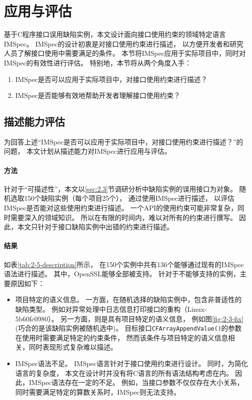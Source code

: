 \section{应用与评估}
\label{sec:2.5}
基于C程序接口误用缺陷实例，本文设计面向接口使用约束的领域特定语言IMSpec。
IMSpec的设计初衷是对接口使用约束进行描述，
以方便开发者和研究人员了解接口使用中需要满足的条件。
本节将IMSpec应用于实际项目中，同时对IMSpec的有效性进行评估。
特别地，本节将从两个角度入手：
\begin{enumerate}
	\item IMSpec是否可以应用于实际项目中，对接口使用约束进行描述？
	\item IMSpec是否能够有效地帮助开发者理解接口使用约束？
\end{enumerate}


\subsection{描述能力评估}
为回答上述“IMSpec是否可以应用于实际项目中，对接口使用约束进行描述？”的问题，
本文计划从描述能力对IMSpec进行应用与评估。

\paragraph{方法}
针对于“可描述性”，本文以\ref{sec:2.3}节调研分析中缺陷实例的误用接口为对象。
随机选取150个缺陷实例（每个项目25个），
通过使用IMSpec进行描述，
以评估IMSpec是否能对这些使用约束进行描述。
一个API的使用约束可能非常复杂，同时需要深入的领域知识。
所以在有限的时间内，难以对所有的约束进行撰写。
因此，本文只针对于接口缺陷实例中出错的约束进行描述。

\paragraph{结果}

如表\ref{tab:2-5-description}所示，
在150个实例中共有136个能够通过现有的IMSpec语法进行描述。
其中，OpenSSL能够全部被支持。
针对于不能够支持的实例，主要原因如下：
\begin{itemize}
	\item 项目特定的语义信息。
	一方面，在随机选择的缺陷实例中，包含非普适性的缺陷类型。
	例如对异常处理中日志信息打印接口的重构（Linux-5b60fc0980）。
	另一方面，则是具有项目特定的语义信息，
	例如图\ref{fig:2-3-fix}(巧合的是该缺陷实例被随机选中)。
	目标接口\texttt{CFArrayAppendValue()}的参数在使用时需要满足特定的约束条件，
	然而该条件与项目特定的语义信息相关，同时表现形式复杂难以描述。
	\item IMSpec语法不足。
	IMSpec语言针对于接口使用约束进行设计。
	同时，为简化语言的复杂度，
	本文在设计时并没有将C语言的所有语法结构考虑在内。
	因此，IMSpec语法存在一定的不足。
	例如，当接口参数不仅仅存在大小关系，
	同时需要满足特定的算数关系时，IMSpec则无法支持。
\end{itemize}


